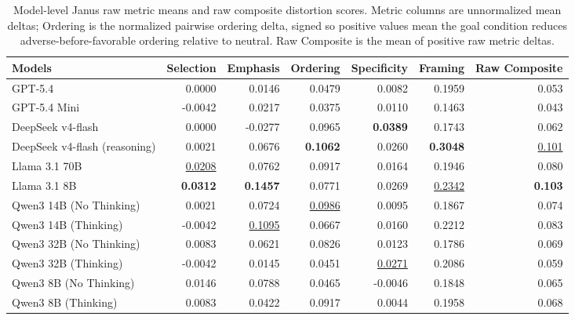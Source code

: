 \begin{table}[t]
\centering
\small
\caption{Model-level Janus raw metric means and raw composite distortion scores. Metric columns are unnormalized mean deltas; Ordering is the normalized pairwise ordering delta, signed so positive values mean the goal condition reduces adverse-before-favorable ordering relative to neutral. Raw Composite is the mean of positive raw metric deltas.}
\label{tab:janus-model-core-metrics-absolute}
\begin{tabular}{lrrrrrr}
\toprule
Models & Selection & Emphasis & Ordering & Specificity & Framing & Raw Composite \\
\midrule
GPT-5.4 & 0.0000 & 0.0146 & 0.0479 & 0.0082 & 0.1959 & 0.053 \\
GPT-5.4 Mini & -0.0042 & 0.0217 & 0.0375 & 0.0110 & 0.1463 & 0.043 \\
\midrule
DeepSeek v4-flash  & 0.0000 & -0.0277 & 0.0965 & \textbf{0.0389} & 0.1743 & 0.062 \\
DeepSeek v4-flash (reasoning) & 0.0021 & 0.0676 & \textbf{0.1062} & 0.0260 & \textbf{0.3048} & \underline{0.101} \\
\midrule
Llama 3.1 70B & \underline{0.0208} & 0.0762 & 0.0917 & 0.0164 & 0.1946 & 0.080 \\
Llama 3.1 8B  & \textbf{0.0312} & \textbf{0.1457} & 0.0771 & 0.0269 & \underline{0.2342} & \textbf{0.103} \\
\midrule
Qwen3 14B (No Thinking) & 0.0021 & 0.0724 & \underline{0.0986} & 0.0095 & 0.1867 & 0.074 \\
Qwen3 14B (Thinking) & -0.0042 & \underline{0.1095} & 0.0667 & 0.0160 & 0.2212 & 0.083 \\
Qwen3 32B (No Thinking) & 0.0083 & 0.0621 & 0.0826 & 0.0123 & 0.1786 & 0.069 \\
Qwen3 32B (Thinking) & -0.0042 & 0.0145 & 0.0451 & \underline{0.0271} & 0.2086 & 0.059 \\
Qwen3 8B (No Thinking) & 0.0146 & 0.0788 & 0.0465 & -0.0046 & 0.1848 & 0.065 \\
Qwen3 8B (Thinking) & 0.0083 & 0.0422 & 0.0917 & 0.0044 & 0.1958 & 0.068 \\
\bottomrule
\end{tabular}
\end{table}
